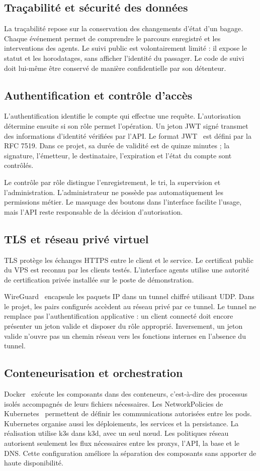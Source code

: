 \documentclass[11pt]{extarticle}
\begin{document}
\subsection{Traçabilité et sécurité des données}
La traçabilité repose sur la conservation des changements d'état d'un bagage. Chaque événement permet de comprendre le parcours enregistré et les interventions des agents. Le suivi public est volontairement limité : il expose le statut et les horodatages, sans afficher l'identité du passager. Le code de suivi doit lui-même être conservé de manière confidentielle par son détenteur.
\subsection{Authentification et contrôle d'accès}
L'authentification identifie le compte qui effectue une requête. L'autorisation détermine ensuite si son rôle permet l'opération. Un jeton JWT signé transmet des informations d'identité vérifiées par l'API. Le format JWT~\cite{jwt} est défini par la RFC 7519. Dans ce projet, sa durée de validité est de quinze minutes ; la signature, l'émetteur, le destinataire, l'expiration et l'état du compte sont contrôlés.

Le contrôle par rôle distingue l'enregistrement, le tri, la supervision et l'administration. L'administrateur ne possède pas automatiquement les permissions métier. Le masquage des boutons dans l'interface facilite l'usage, mais l'API reste responsable de la décision d'autorisation.
\subsection{TLS et réseau privé virtuel}
TLS protège les échanges HTTPS entre le client et le service. Le certificat public du VPS est reconnu par les clients testés. L'interface agents utilise une autorité de certification privée installée sur le poste de démonstration.

WireGuard~\cite{wireguard} encapsule les paquets IP dans un tunnel chiffré utilisant UDP. Dans le projet, les pairs configurés accèdent au réseau privé par ce tunnel. Le tunnel ne remplace pas l'authentification applicative : un client connecté doit encore présenter un jeton valide et disposer du rôle approprié. Inversement, un jeton valide n'ouvre pas un chemin réseau vers les fonctions internes en l'absence du tunnel.
\subsection{Conteneurisation et orchestration}
Docker~\cite{docker} exécute les composants dans des conteneurs, c'est-à-dire des processus isolés accompagnés de leurs fichiers nécessaires. Les NetworkPolicies de Kubernetes~\cite{kubernetes} permettent de définir les communications autorisées entre les pods. Kubernetes organise aussi les déploiements, les services et la persistance. La réalisation utilise k3s dans k3d, avec un seul nœud. Les politiques réseau autorisent seulement les flux nécessaires entre les proxys, l'API, la base et le DNS. Cette configuration améliore la séparation des composants sans apporter de haute disponibilité.
\end{document}

